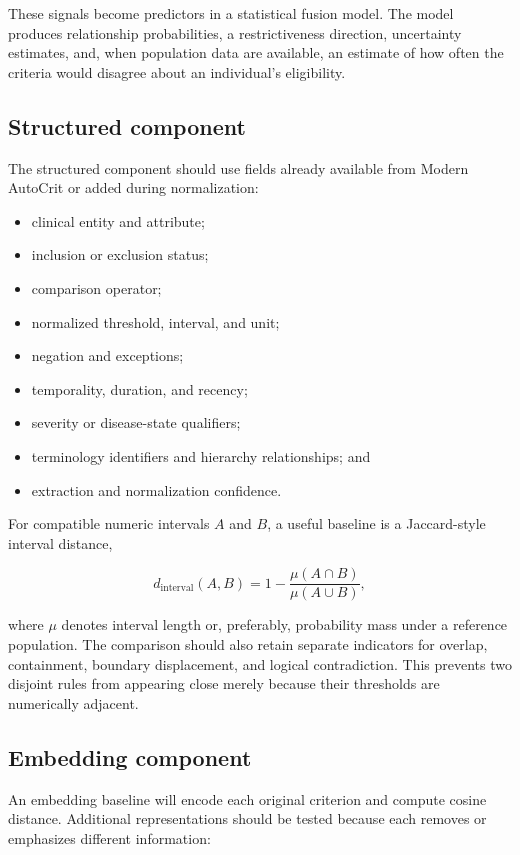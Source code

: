 \documentclass[11pt]{article}
\begin{document}
These signals become predictors in a statistical fusion model. The model produces relationship probabilities, a restrictiveness direction, uncertainty estimates, and, when population data are available, an estimate of how often the criteria would disagree about an individual's eligibility.

\subsection{Structured component}

The structured component should use fields already available from Modern AutoCrit or added during normalization:

\begin{itemize}
    \item clinical entity and attribute;
    \item inclusion or exclusion status;
    \item comparison operator;
    \item normalized threshold, interval, and unit;
    \item negation and exceptions;
    \item temporality, duration, and recency;
    \item severity or disease-state qualifiers;
    \item terminology identifiers and hierarchy relationships; and
    \item extraction and normalization confidence.
\end{itemize}

For compatible numeric intervals $A$ and $B$, a useful baseline is a Jaccard-style interval distance,

\[
d_{\mathrm{interval}}(A,B)
=1-\frac{\mu(A\cap B)}{\mu(A\cup B)},
\]

where $\mu$ denotes interval length or, preferably, probability mass under a reference population. The comparison should also retain separate indicators for overlap, containment, boundary displacement, and logical contradiction. This prevents two disjoint rules from appearing close merely because their thresholds are numerically adjacent.

\subsection{Embedding component}

An embedding baseline will encode each original criterion and compute cosine distance. Additional representations should be tested because each removes or emphasizes different information:
\end{document}
